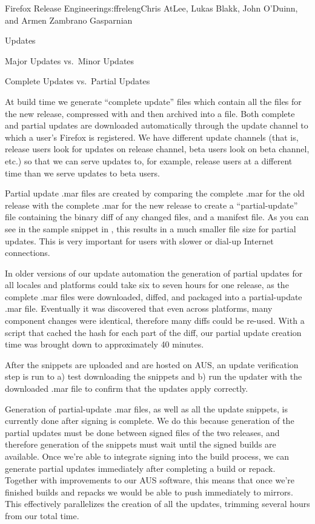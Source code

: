 \begin{aosachapter}{Firefox Release Engineering}{s:ffreleng}{Chris AtLee, Lukas Blakk, John O'Duinn, and Armen Zambrano Gasparnian}
\begin{aosasect1}{Updates}
\begin{aosasect2}{Major Updates vs.\ Minor Updates}
\end{aosasect2}

\begin{aosasect2}{Complete Updates vs.\ Partial Updates}

At build time we generate ``complete update''  files which
contain all the files for the new release, compressed with 
and then archived into a  file. Both complete and partial
updates are downloaded automatically through the update channel to which a 
user's Firefox is registered. We have different update channels (that is,
release users look
for updates on release channel, beta users look on beta channel, etc.) so that
we can serve updates to, for example, release users at a different time than 
we serve updates to beta users.

Partial update .mar files are created by comparing the complete .mar for the
old release with the complete .mar for the new release to create a
``partial-update''  file containing the binary diff of any
changed files, and a manifest file. As you can see in the sample
snippet in , this results in a much smaller file size for partial
updates. This is very important for users with slower or
dial-up Internet connections.

In older versions of our update automation the generation of partial
updates for all locales and platforms could take six to seven hours for one
release, as the complete .mar files were downloaded, diffed, and packaged into a
partial-update .mar file. Eventually it was discovered that even
across platforms, many component changes were identical, therefore many diffs could be re-used. With a
script that cached the hash for each part of the diff, our partial
update creation time was brought down to approximately 40 minutes. 

After the snippets are
uploaded and are hosted on AUS, an update verification step is run to
a) test downloading the snippets and b) run the updater with the
downloaded .mar file to confirm that the updates apply correctly.

Generation of partial-update .mar files, as well as all the update snippets,
is currently done after signing is complete. We do this because
generation of the partial updates must be done between signed files of
the two releases, and therefore generation of the snippets must wait
until the signed builds are available.  Once we're able to integrate
signing into the build process, we can generate partial updates
immediately after completing a build or repack. Together with
improvements to our AUS software, this means that once we're finished
builds and repacks we would be able to push immediately to
mirrors. This effectively parallelizes the creation of all the
updates, trimming several hours from our total time.
  

\end{aosasect2}
\end{aosasect1}
\end{aosachapter}
